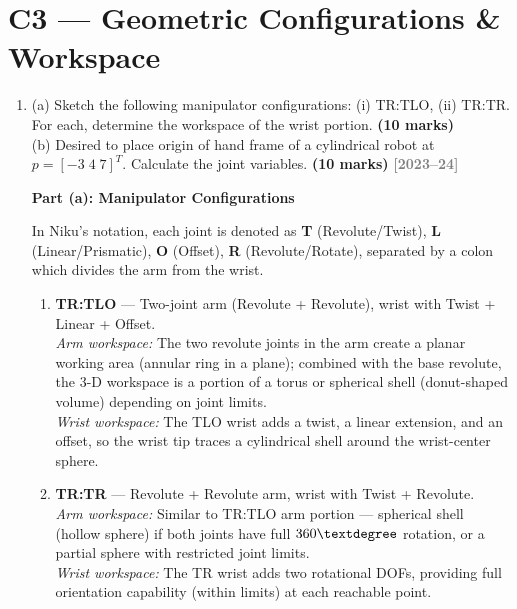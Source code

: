 \documentclass[12pt,a3paper]{article}
\newcommand{\yr}[1]{\hfill\textcolor{gray}{\small\textbf{[#1]}}}
\newcommand{\mk}[1]{\textcolor{orange!70!black}{\small\textbf{(#1 marks)}}}
\begin{document}
\section{C3 --- Geometric Configurations \& Workspace}

\begin{enumerate}
\item \label{qlabel:C3-Q1}
(a) Sketch the following manipulator configurations: (i) TR:TLO, (ii) TR:TR. For each, determine the workspace of the wrist portion. \mk{10}\\
(b) Desired to place origin of hand frame of a cylindrical robot at $p = [-3\;4\;7]^T$. Calculate the joint variables. \mk{10}
\yr{2023--24}

\begin{tcolorbox}[enhanced,breakable,ansbox,colback=cC!4,colframe=cC,
  boxrule=0.8pt,arc=5pt,
  title={\textbf{Answer}},fonttitle=\bfseries\color{white},colbacktitle=cC]

\textbf{Part (a): Manipulator Configurations}

\medskip
In Niku's notation, each joint is denoted as \textbf{T} (Revolute/Twist),
\textbf{L} (Linear/Prismatic), \textbf{O} (Offset), \textbf{R}
(Revolute/Rotate), separated by a colon which divides the arm from the
wrist.

\begin{enumerate}[label=\textbf{(\roman*)}]
  \item \textbf{TR:TLO} — Two-joint arm (Revolute + Revolute), wrist
    with Twist + Linear + Offset.\\
    \textit{Arm workspace:} The two revolute joints in the arm create a
    planar working area (annular ring in a plane); combined with the
    base revolute, the 3-D workspace is a portion of a torus or
    spherical shell (donut-shaped volume) depending on joint limits.\\
    \textit{Wrist workspace:} The TLO wrist adds a twist, a linear
    extension, and an offset, so the wrist tip traces a cylindrical
    shell around the wrist-center sphere.

  \item \textbf{TR:TR} — Revolute + Revolute arm, wrist with Twist +
    Revolute.\\
    \textit{Arm workspace:} Similar to TR:TLO arm portion — spherical
    shell (hollow sphere) if both joints have full $360\textdegree$
    rotation, or a partial sphere with restricted joint limits.\\
    \textit{Wrist workspace:} The TR wrist adds two rotational DOFs,
    providing full orientation capability (within limits) at each
    reachable point.
\end{enumerate}


\end{tcolorbox}
\end{enumerate}
\end{document}
